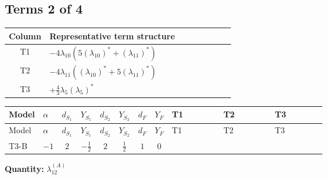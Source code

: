 \documentclass[8pt]{article}
\begin{document}
\begin{landscape}
\subsection*{Terms 2 of 4}
\begin{center}
\begin{tabular}{@{}c >{\raggedright\arraybackslash}p{0.82\linewidth}@{}}
\toprule
Column & Representative term structure \\
\midrule
T1 & \(\displaystyle -4 {\lambda_{10}} (5 \left({\lambda_{10}}\right)^{*}+\left({\lambda_{11}}\right)^{*})\) \\
\midrule
T2 & \(\displaystyle -4 {\lambda_{11}} (\left({\lambda_{10}}\right)^{*}+5 \left({\lambda_{11}}\right)^{*})\) \\
\midrule
T3 & \(\displaystyle +\frac{4}{3} {\lambda_5} \left({\lambda_5}\right)^{*}\) \\
\midrule
\bottomrule
\end{tabular}
\end{center}
\smallskip
\tiny
\begin{longtable}{@{}llcccccc >{\raggedright\arraybackslash}p{0.21\linewidth} >{\raggedright\arraybackslash}p{0.21\linewidth} >{\raggedright\arraybackslash}p{0.21\linewidth}@{}}
\toprule
Model & $\alpha$ & $d_{S_1}$ & $Y_{S_1}$ & $d_{S_2}$ & $Y_{S_2}$ & $d_F$ & $Y_F$ & T1 & T2 & T3 \\
\midrule
\endfirsthead
\toprule
Model & $\alpha$ & $d_{S_1}$ & $Y_{S_1}$ & $d_{S_2}$ & $Y_{S_2}$ & $d_F$ & $Y_F$ & T1 & T2 & T3 \\
\midrule
\endhead
T3-B & $-1$ & $2$ & $-\frac{1}{2}$ & $2$ & $\frac{1}{2}$ & $1$ & $0$ & \scriptsize\adjustbox{max width=\linewidth}{$\begin{gathered} -4 {\lambda_{10}} (5 \left({\lambda_{10}}\right)^{*}+\left({\lambda_{11}}\right)^{*})\end{gathered}$} & \scriptsize\adjustbox{max width=\linewidth}{$\begin{gathered} -4 {\lambda_{11}} (\left({\lambda_{10}}\right)^{*}+5 \left({\lambda_{11}}\right)^{*})\end{gathered}$} & \scriptsize\adjustbox{max width=\linewidth}{$\begin{gathered} +\frac{4}{3} {\lambda_5} \left({\lambda_5}\right)^{*}\end{gathered}$} \\
\midrule
\bottomrule
\end{longtable}
\clearpage
\noindent\textbf{Quantity: }$\lambda_{12}^{(A)}$\par\smallskip

\end{landscape}
\end{document}
